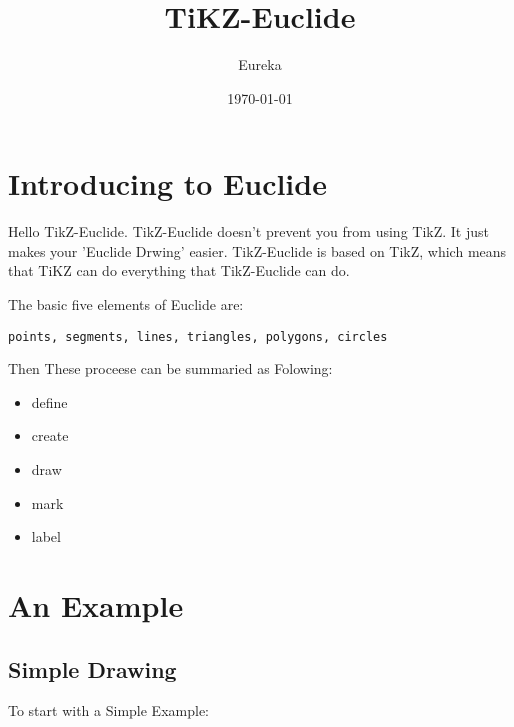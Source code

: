 \documentclass[12pt]{article}
\title{TiKZ-Euclide}
\author{Eureka}
\date{\today}
\begin{document}
\maketitle
\tableofcontents
\clearpage



\section{Introducing to Euclide}
Hello TikZ-Euclide. TikZ-Euclide doesn't prevent you from using TikZ. 
It just makes your 'Euclide Drwing' easier. TikZ-Euclide is based on TikZ, 
which means that TiKZ can do everything that TikZ-Euclide can do.

The basic five elements of Euclide are:

\verb|points, segments, lines, triangles, polygons, circles|

Then These proceese can be summaried as Folowing:
\begin{multicols}{2}
    \begin{itemize}
        \item define
        \item create 
        \item draw
        \item mark 
        \item label
    \end{itemize}    
\end{multicols}


\section{An Example}
\subsection{Simple Drawing}
To start with a Simple Example:

\begin{multicols}{2}
\begin{bytes}
\end{bytes}
\columnbreak
{}  
\end{multicols}
\end{document}
